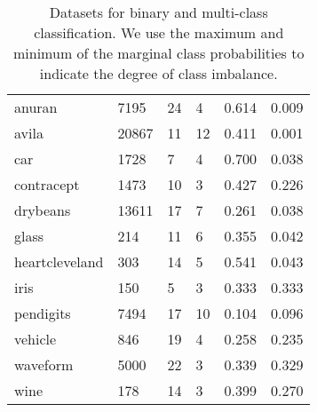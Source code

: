 \begin{table}[ht]
\begin{tabular}{|l|ll|l|cc|}
  anuran & 7195 &   24 &    4 & 0.614 & 0.009 \\ 
  avila & 20867 &   11 &   12 & 0.411 & 0.001 \\ 
  car & 1728 &    7 &    4 & 0.700 & 0.038 \\ 
  contracept & 1473 &   10 &    3 & 0.427 & 0.226 \\ 
  drybeans & 13611 &   17 &    7 & 0.261 & 0.038 \\ 
  glass &  214 &   11 &    6 & 0.355 & 0.042 \\ 
  heartcleveland &  303 &   14 &    5 & 0.541 & 0.043 \\ 
  iris &  150 &    5 &    3 & 0.333 & 0.333 \\ 
  pendigits & 7494 &   17 &   10 & 0.104 & 0.096 \\ 
  vehicle &  846 &   19 &    4 & 0.258 & 0.235 \\ 
  waveform & 5000 &   22 &    3 & 0.339 & 0.329 \\ 
  wine &  178 &   14 &    3 & 0.399 & 0.270 \\ 
   \hline
\end{tabular}
\caption{Datasets for binary and multi-class classification. We use the maximum and minimum of the marginal class probabilities to indicate the degree of class imbalance. } 
\label{table:data_info}
\end{table}